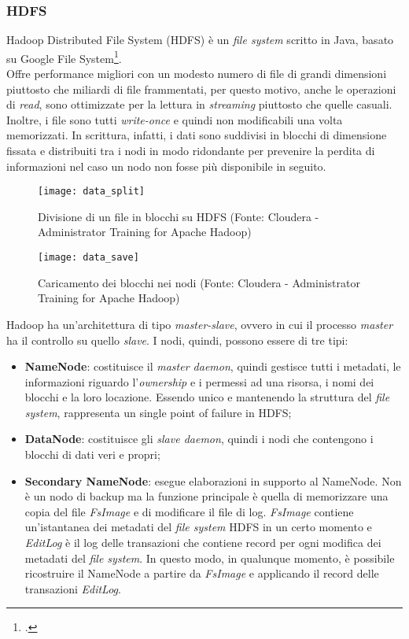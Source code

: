 \subsubsection{HDFS}
Hadoop Distributed File System (HDFS) è un \textit{file system} scritto in Java, basato su Google File System\footcite{site:gfs}. \\
Offre performance migliori con un modesto numero di file di grandi dimensioni piuttosto che miliardi di file frammentati, per questo motivo, anche le operazioni di \textit{read}, sono ottimizzate per la lettura in \textit{streaming} piuttosto che quelle casuali. Inoltre, i file sono tutti \textit{write-once} e quindi non modificabili una volta memorizzati.
In scrittura, infatti, i dati sono suddivisi in blocchi di dimensione fissata e distribuiti tra i nodi in modo ridondante per prevenire la perdita di informazioni nel caso un nodo non fosse più disponibile in seguito.
\begin{figure}[!h]
	\centering
	\texttt{[image: data\_split]}
	\caption{Divisione di un file in blocchi su HDFS (Fonte: Cloudera - Administrator Training for Apache Hadoop)}
\end{figure}
\clearpage
\begin{figure}[!h]
	\centering
	\texttt{[image: data\_save]}
	\caption{Caricamento dei blocchi nei nodi (Fonte: Cloudera - Administrator Training for Apache Hadoop)}
\end{figure}
Hadoop ha un'architettura di tipo \textit{master-slave}, ovvero in cui il processo \textit{master} ha il controllo su quello \textit{slave}. I nodi, quindi, possono essere di tre tipi:
\begin{itemize}
	\item \textbf{NameNode}: costituisce il \textit{master \gls{daemon}}, quindi gestisce tutti i metadati, le informazioni riguardo l'\textit{ownership} e i permessi ad una risorsa, i nomi dei blocchi e la loro locazione. Essendo unico e mantenendo la struttura del \textit{file system}, rappresenta un \gls{single point of failure} in \gls{HDFS};
	\item \textbf{DataNode}: costituisce gli \textit{slave \gls{daemon}}, quindi i nodi che contengono i blocchi di dati veri e propri;
	\item \textbf{Secondary NameNode}: esegue elaborazioni in supporto al NameNode. Non è un nodo di backup ma la funzione principale è quella di memorizzare una copia del file \textit{FsImage} e di modificare il file di log. \textit{FsImage} contiene un'istantanea dei metadati del \textit{file system} HDFS in un certo momento e \textit{EditLog} è il log delle transazioni che contiene record per ogni modifica dei metadati del \textit{file system}. In questo modo, in qualunque momento, è possibile ricostruire il NameNode a partire da \textit{FsImage} e applicando il record delle transazioni \textit{EditLog}.
\end{itemize}
